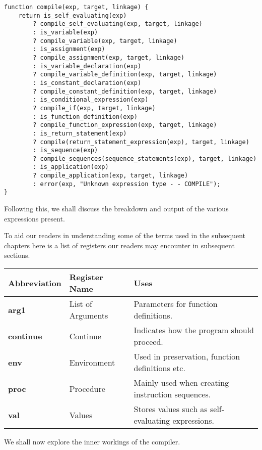 \begin{lstlisting}[caption=Top level compile view]
function compile(exp, target, linkage) {
    return is_self_evaluating(exp)
        ? compile_self_evaluating(exp, target, linkage)
        : is_variable(exp)
        ? compile_variable(exp, target, linkage)
        : is_assignment(exp)
        ? compile_assignment(exp, target, linkage)
        : is_variable_declaration(exp)
        ? compile_variable_definition(exp, target, linkage)
        : is_constant_declaration(exp)
        ? compile_constant_definition(exp, target, linkage)
        : is_conditional_expression(exp) 
        ? compile_if(exp, target, linkage)
        : is_function_definition(exp)
        ? compile_function_expression(exp, target, linkage)
        : is_return_statement(exp)
        ? compile(return_statement_expression(exp), target, linkage)
        : is_sequence(exp)
        ? compile_sequences(sequence_statements(exp), target, linkage)
        : is_application(exp)
        ? compile_application(exp, target, linkage)
        : error(exp, "Unknown expression type - - COMPILE");
}
\end{lstlisting}

\noindent
Following this, we shall discuss the breakdown and output of the various expressions present.\newline

To aid our readers in understanding some of the terms used in the subsequent chapters here is a list of registers our readers may encounter in subsequent sections.
\begin{center}
\begin{tabular}{|l|ll|} \hline 
Abbreviation & Register Name & Uses\\ \hline
\textbf{arg1}  & List of Arguments & Parameters for function definitions. \\ 
\textbf{continue} & Continue & Indicates how the program should proceed.\\
\textbf{env} & Environment & Used in preservation, function definitions etc.\\
\textbf{proc}  & Procedure & Mainly used when creating instruction sequences. \\ 
\textbf{val} & Values & Stores values such as self-evaluating expressions. \\ \hline
\end{tabular}
\end{center}

We shall now explore the inner workings of the compiler.

